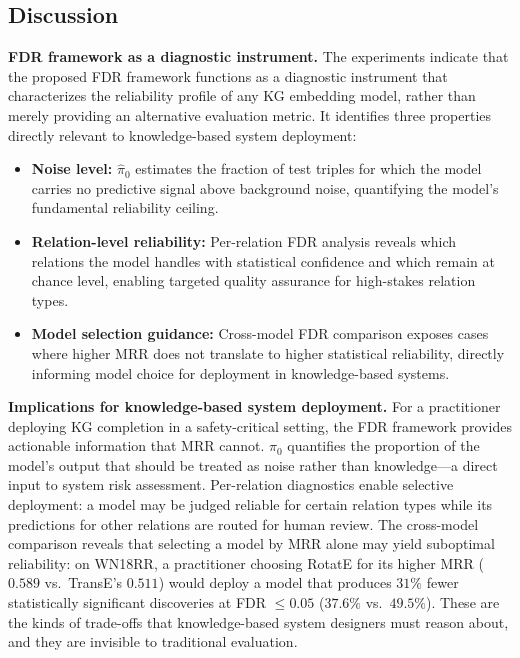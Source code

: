 \subsection{Discussion}
\label{subsec:discussion}

\textbf{FDR framework as a diagnostic instrument.}
The experiments indicate that the proposed FDR framework functions as a diagnostic instrument that characterizes the reliability profile of any KG embedding model, rather than merely providing an alternative evaluation metric.
It identifies three properties directly relevant to knowledge-based system deployment:
\begin{itemize}
    \item \textbf{Noise level:} $\hat{\pi}_0$ estimates the fraction of test triples for which the model carries no predictive signal above background noise, quantifying the model's fundamental reliability ceiling.
    \item \textbf{Relation-level reliability:} Per-relation FDR analysis reveals which relations the model handles with statistical confidence and which remain at chance level, enabling targeted quality assurance for high-stakes relation types.
    \item \textbf{Model selection guidance:} Cross-model FDR comparison exposes cases where higher MRR does not translate to higher statistical reliability, directly informing model choice for deployment in knowledge-based systems.
\end{itemize}

\textbf{Implications for knowledge-based system deployment.}
For a practitioner deploying KG completion in a safety-critical setting, the FDR framework provides actionable information that MRR cannot.
$\hat{\pi}_0$ quantifies the proportion of the model's output that should be treated as noise rather than knowledge---a direct input to system risk assessment.
Per-relation diagnostics enable selective deployment: a model may be judged reliable for certain relation types while its predictions for other relations are routed for human review.
The cross-model comparison reveals that selecting a model by MRR alone may yield suboptimal reliability: on WN18RR, a practitioner choosing RotatE for its higher MRR ($0.589$ vs.\ TransE's $0.511$) would deploy a model that produces $31\%$ fewer statistically significant discoveries at FDR $\leq 0.05$ ($37.6\%$ vs.\ $49.5\%$).
These are the kinds of trade-offs that knowledge-based system designers must reason about, and they are invisible to traditional evaluation.

